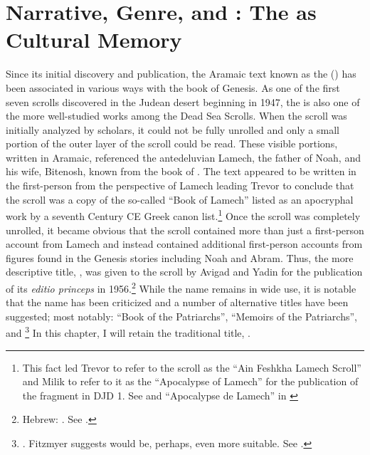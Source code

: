 
\chapter{Narrative, Genre, and \Psy: The \ga as Cultural Memory}
\label{chap:ga}


Since its initial discovery and publication, the Aramaic text known as the \ga () has been associated in various ways with the book of Genesis. As one of the first seven scrolls discovered in the Judean desert beginning in 1947, the \ga is also one of the more well-studied works among the Dead Sea Scrolls. When the scroll was initially analyzed by scholars, it could not be fully unrolled and only a small portion of the outer layer of the scroll could be read. These visible portions, written in Aramaic, referenced the antedeluvian Lamech, the father of Noah, and his wife, Bitenosh, known from the book of \jub. The text appeared to be written in the first-person from the perspective of Lamech leading Trevor to conclude that the scroll was a copy of the so-called ``Book of Lamech'' listed as an apocryphal work by a seventh Century CE Greek canon list.\footnote{This fact led Trevor to refer to the scroll as the ``Ain Feshkha Lamech Scroll'' and Milik to refer to it as the ``Apocalypse of Lamech'' for the publication of the fragment in DJD 1. See \cite[9--10]{trevor_basor1949} and ``Apocalypse de Lamech'' in \cite[86--87]{djd_1}} Once the scroll was completely unrolled, it became obvious that the scroll contained more than just a first-person account from Lamech and instead contained additional first-person accounts from figures found in the Genesis stories including Noah and Abram. Thus, the more descriptive title, , was given to the scroll by Avigad and Yadin for the publication of its \emph{editio princeps} in 1956.\footnote{Hebrew: . See \cite{avigad-yadin1956}.} While the name \ga remains in wide use, it is notable that the name has been criticized and a number of alternative titles have been suggested; most notably: ``Book of the Patriarchs''\autocite[Hebrew: . As suggested by Mazar in][379 n. 2]{flusser_ks1956}, ``Memoirs of the Patriarchs''\autocite[358]{gaster1976}, and \footnote{\cite[14 n. 1.]{milik1959}.  Fitzmyer suggests  would be, perhaps, even more suitable. See \cite[16]{fitzmyer2004}.} In this chapter, I will retain the traditional title, \ga.

